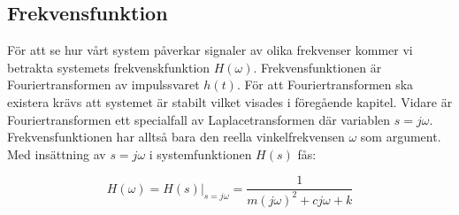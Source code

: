\subsection{Frekvensfunktion}
För att se hur vårt system påverkar signaler av olika frekvenser kommer vi betrakta systemets frekvenskfunktion $H(\omega)$.
Frekvensfunktionen är Fouriertransformen av impulssvaret $h(t)$. För att Fouriertransformen ska existera krävs att systemet är stabilt vilket visades i föregående kapitel. Vidare är Fouriertransformen ett specialfall av Laplacetransformen där variablen $s = j\omega$. Frekvensfunktionen har alltså bara den reella vinkelfrekvensen $\omega$ som argument. Med insättning av $s = j\omega$ i systemfunktionen $H(s)$ fås: 

$$H(\omega)=H(s)\bigg\rvert_{s=j\omega}=\dfrac{1}{m(j\omega)^2+cj\omega+k}$$

\newpage
